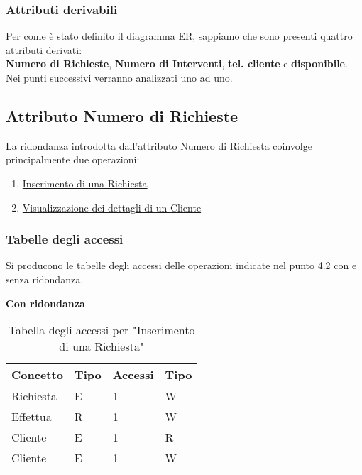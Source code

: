 \documentclass{article}
\begin{document}
\subsubsection{Attributi derivabili}

Per come è stato definito il diagramma ER, sappiamo che sono presenti quattro attributi derivati: \\ \textbf{Numero di Richieste}, \textbf{Numero di Interventi}, \textbf{tel. cliente} e \textbf{disponibile}.\\
Nei punti successivi verranno analizzati uno ad uno.

\newpage

\subsection{Attributo Numero di Richieste}

La ridondanza introdotta dall'attributo Numero di Richiesta coinvolge principalmente due operazioni:
\begin{enumerate}
    \item \underline{Inserimento di una Richiesta}
    \item \underline{Visualizzazione dei dettagli di un Cliente}
\end{enumerate}

\subsubsection{Tabelle degli accessi}

Si producono le tabelle degli accessi delle operazioni indicate nel punto 4.2 con e senza ridondanza.

\textbf{Con ridondanza}

\begin{table}[h]
    \centering
    \begin{adjustbox}{width=0.6\textwidth}
        \begin{tabular}{|m{2cm}|m{2cm}|m{2cm}|m{2cm}|}
            \hline  
            \textbf{Concetto} & \textbf{Tipo} & \textbf{Accessi} & \textbf{Tipo}\\ 
            \hline
            Richiesta & E & 1 & W\\
            \hline
            Effettua & R & 1 & W\\
            \hline
            Cliente & E & 1 & R\\
            \hline
            Cliente & E & 1 & W\\
            \hline
        \end{tabular}
    \end{adjustbox}
    \caption{Tabella degli accessi per "Inserimento di una Richiesta" }
    \label{tab:accesstable}
\end{table}
\end{document}
